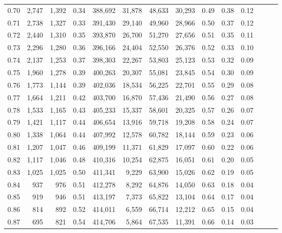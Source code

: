 \begin{tabular}{rrrrrrrrrrrrrr}
0.70 &   2,747 &  1,392 &  0.34 &  388,692 &   31,878 &  48,633 &  30,293 &  0.49 &  0.38 &      0.12 \\
0.71 &   2,738 &  1,327 &  0.33 &  391,430 &   29,140 &  49,960 &  28,966 &  0.50 &  0.37 &      0.12 \\
0.72 &   2,440 &  1,310 &  0.35 &  393,870 &   26,700 &  51,270 &  27,656 &  0.51 &  0.35 &      0.11 \\
0.73 &   2,296 &  1,280 &  0.36 &  396,166 &   24,404 &  52,550 &  26,376 &  0.52 &  0.33 &      0.10 \\
0.74 &   2,137 &  1,253 &  0.37 &  398,303 &   22,267 &  53,803 &  25,123 &  0.53 &  0.32 &      0.09 \\
0.75 &   1,960 &  1,278 &  0.39 &  400,263 &   20,307 &  55,081 &  23,845 &  0.54 &  0.30 &      0.09 \\
0.76 &   1,773 &  1,144 &  0.39 &  402,036 &   18,534 &  56,225 &  22,701 &  0.55 &  0.29 &      0.08 \\
0.77 &   1,664 &  1,211 &  0.42 &  403,700 &   16,870 &  57,436 &  21,490 &  0.56 &  0.27 &      0.08 \\
0.78 &   1,533 &  1,165 &  0.43 &  405,233 &   15,337 &  58,601 &  20,325 &  0.57 &  0.26 &      0.07 \\
0.79 &   1,421 &  1,117 &  0.44 &  406,654 &   13,916 &  59,718 &  19,208 &  0.58 &  0.24 &      0.07 \\
0.80 &   1,338 &  1,064 &  0.44 &  407,992 &   12,578 &  60,782 &  18,144 &  0.59 &  0.23 &      0.06 \\
0.81 &   1,207 &  1,047 &  0.46 &  409,199 &   11,371 &  61,829 &  17,097 &  0.60 &  0.22 &      0.06 \\
0.82 &   1,117 &  1,046 &  0.48 &  410,316 &   10,254 &  62,875 &  16,051 &  0.61 &  0.20 &      0.05 \\
0.83 &   1,025 &  1,025 &  0.50 &  411,341 &    9,229 &  63,900 &  15,026 &  0.62 &  0.19 &      0.05 \\
0.84 &     937 &    976 &  0.51 &  412,278 &    8,292 &  64,876 &  14,050 &  0.63 &  0.18 &      0.04 \\
0.85 &     919 &    946 &  0.51 &  413,197 &    7,373 &  65,822 &  13,104 &  0.64 &  0.17 &      0.04 \\
0.86 &     814 &    892 &  0.52 &  414,011 &    6,559 &  66,714 &  12,212 &  0.65 &  0.15 &      0.04 \\
0.87 &     695 &    821 &  0.54 &  414,706 &    5,864 &  67,535 &  11,391 &  0.66 &  0.14 &      0.03 \\

\end{tabular}
